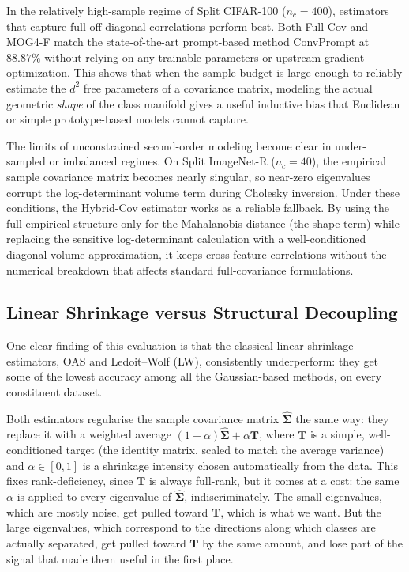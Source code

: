 In the relatively high-sample regime of Split CIFAR-100 ($n_c = 400$), estimators that capture full off-diagonal correlations perform best. Both Full-Cov and MOG4-F match the state-of-the-art prompt-based method ConvPrompt at $88.87\%$ without relying on any trainable parameters or upstream gradient optimization. This shows that when the sample budget is large enough to reliably estimate the $d^2$ free parameters of a covariance matrix, modeling the actual geometric \emph{shape} of the class manifold gives a useful inductive bias that Euclidean or simple prototype-based models cannot capture.

The limits of unconstrained second-order modeling become clear in under-sampled or imbalanced regimes. On Split ImageNet-R ($n_c = 40$), the empirical sample covariance matrix becomes nearly singular, so near-zero eigenvalues corrupt the log-determinant volume term during Cholesky inversion. Under these conditions, the Hybrid-Cov estimator works as a reliable fallback. By using the full empirical structure only for the Mahalanobis distance (the shape term) while replacing the sensitive log-determinant calculation with a well-conditioned diagonal volume approximation, it keeps cross-feature correlations without the numerical breakdown that affects standard full-covariance formulations.

\subsection{Linear Shrinkage versus Structural Decoupling}
\label{sec:an:shrinkage}

One clear finding of this evaluation is that the classical linear shrinkage estimators, OAS and Ledoit--Wolf (LW), consistently underperform: they get some of the lowest accuracy among all the Gaussian-based methods, on every constituent dataset.

Both estimators regularise the sample covariance matrix $\hat{\boldsymbol{\Sigma}}$ the same way: they replace it with a weighted average $(1-\alpha)\hat{\boldsymbol{\Sigma}} + \alpha \mathbf{T}$, where $\mathbf{T}$ is a simple, well-conditioned target (the identity matrix, scaled to match the average variance) and $\alpha \in [0,1]$ is a shrinkage intensity chosen automatically from the data. This fixes rank-deficiency, since $\mathbf{T}$ is always full-rank, but it comes at a cost: the same $\alpha$ is applied to every eigenvalue of $\hat{\boldsymbol{\Sigma}}$, indiscriminately. The small eigenvalues, which are mostly noise, get pulled toward $\mathbf{T}$, which is what we want. But the large eigenvalues, which correspond to the directions along which classes are actually separated, get pulled toward $\mathbf{T}$ by the same amount, and lose part of the signal that made them useful in the first place.

